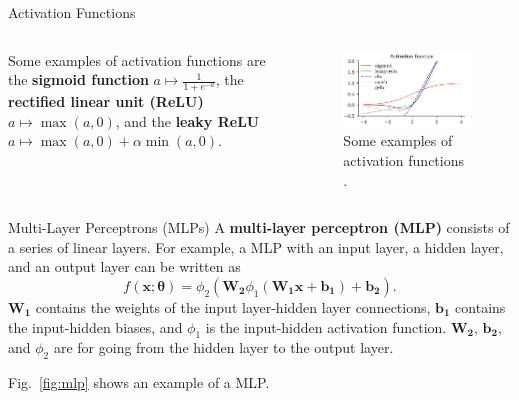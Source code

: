 \documentclass{beamer}
\begin{document}
\begin{frame}{Activation Functions}
    \begin{columns}
            Some examples of activation functions are the \textbf{sigmoid function} $a \mapsto \frac{1}{1 + e^{-a}}$, the \textbf{rectified linear unit (ReLU)} $a \mapsto \max(a, 0)$, and the \textbf{leaky ReLU} $a \mapsto\max(a, 0) + \alpha\min(a, 0)$.
            \begin{figure}
                \centering
                \includegraphics[scale=0.5]{activation_functions}
                \caption{Some examples of activation functions \cite{pml2Book}.}
                \label{fig:activation_functions}
            \end{figure}
    \end{columns}
\end{frame}

\begin{frame}{Multi-Layer Perceptrons (MLPs)}
    A \textbf{multi-layer perceptron (MLP)} consists of a series of linear layers. For example, a MLP with an input layer, a hidden layer, and an output layer can be written as
    \[
    f(\boldsymbol{x}; \boldsymbol{\theta}) = \phi_2(\boldsymbol{W_2}\phi_1(\boldsymbol{W_1}\boldsymbol{x} + \boldsymbol{b_1}) + \boldsymbol{b_2}).
    \]
    $\boldsymbol{W_1}$ contains the weights of the input layer-hidden layer connections, $\boldsymbol{b_1}$ contains the input-hidden biases, and $\phi_1$ is the input-hidden activation function. $\boldsymbol{W_2}$, $\boldsymbol{b_2}$, and $\phi_2$ are for going from the hidden layer to the output layer.
    
    \medskip
    
    Fig.~\ref{fig:mlp} shows an example of a MLP.
\end{frame}
\end{document}
